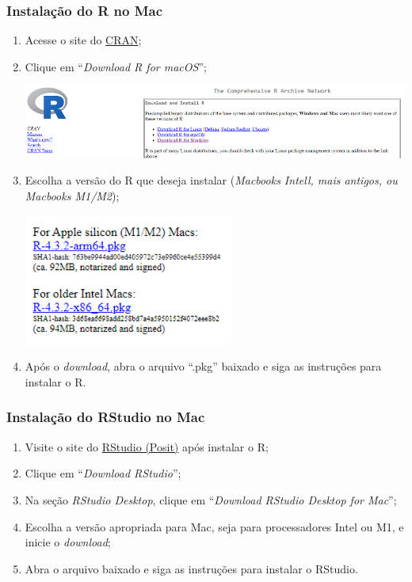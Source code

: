 \documentclass[
]{book}
\begin{document}
\subsubsection{Instalação do R no Mac}\label{instalauxe7uxe3o-do-r-no-mac}

\begin{enumerate}
\def\labelenumi{\arabic{enumi}.}
\item
  Acesse o site do \href{https://cran.r-project.org}{CRAN};
\item
  Clique em ``\emph{Download R for macOS}'';

  \includegraphics{images/clipboard-2368293499.png}
\item
  Escolha a versão do R que deseja instalar (\emph{Macbooks Intell, mais antigos, ou Macbooks M1/M2});

  \includegraphics[width=2.69792in,height=\textheight]{images/clipboard-3553229090.png}
\item
  Após o \emph{download}, abra o arquivo ``.pkg'' baixado e siga as instruções para instalar o R.
\end{enumerate}

\subsubsection{Instalação do RStudio no Mac}\label{instalauxe7uxe3o-do-rstudio-no-mac}

\begin{enumerate}
\def\labelenumi{\arabic{enumi}.}
\item
  Visite o site do \href{https://posit.co/download/rstudio-desktop/}{RStudio (Posit)} após instalar o R;
\item
  Clique em ``\emph{Download RStudio}'';
\item
  Na seção \emph{RStudio Desktop}, clique em ``\emph{Download RStudio Desktop for Mac}'';
\item
  Escolha a versão apropriada para Mac, seja para processadores Intel ou M1, e inicie o \emph{download};
\item
  Abra o arquivo baixado e siga as instruções para instalar o RStudio.
\end{enumerate}
\end{document}
